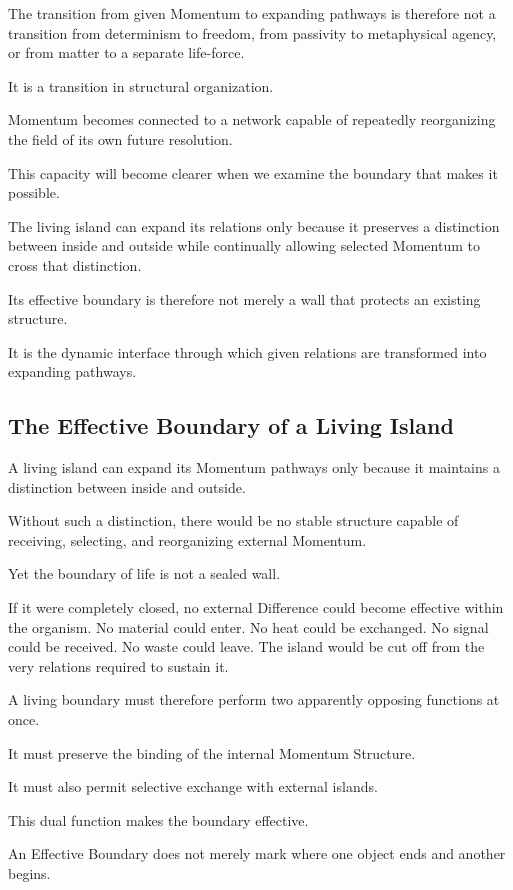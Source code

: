 The transition from given Momentum to expanding pathways is therefore not a transition from determinism to freedom, from passivity to metaphysical agency, or from matter to a separate life-force.

It is a transition in structural organization.

Momentum becomes connected to a network capable of repeatedly reorganizing the field of its own future resolution.

This capacity will become clearer when we examine the boundary that makes it possible.

The living island can expand its relations only because it preserves a distinction between inside and outside while continually allowing selected Momentum to cross that distinction.

Its effective boundary is therefore not merely a wall that protects an existing structure.

It is the dynamic interface through which given relations are transformed into expanding pathways.

\subsection*{\textbf{The Effective Boundary of a Living Island}}

A living island can expand its Momentum pathways only because it maintains a distinction between inside and outside.

Without such a distinction, there would be no stable structure capable of receiving, selecting, and reorganizing external Momentum.

Yet the boundary of life is not a sealed wall.

If it were completely closed, no external Difference could become effective within the organism. No material could enter. No heat could be exchanged. No signal could be received. No waste could leave. The island would be cut off from the very relations required to sustain it.

A living boundary must therefore perform two apparently opposing functions at once.

It must preserve the binding of the internal Momentum Structure.

It must also permit selective exchange with external islands.

This dual function makes the boundary effective.

An Effective Boundary does not merely mark where one object ends and another begins.

